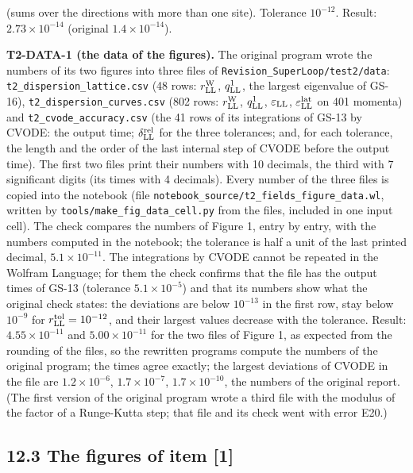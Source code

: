 \documentclass[
  10pt,
]{article}
\begin{document}
(sums over the directions with more than one site). Tolerance
\(10^{-12}\). Result: \(2.73\times10^{-14}\) (original
\(1.4\times10^{-14}\)).

\textbf{T2-DATA-1 (the data of the figures).} The original program wrote
the numbers of its two figures into three files of
\texttt{Revision\_SuperLoop/test2/data}:
\texttt{t2\_dispersion\_lattice.csv} (48 rows: \(r^{\rm W}_{\rm LL}\),
\(q^1_{\rm LL}\), the largest eigenvalue of GS-16),
\texttt{t2\_dispersion\_curves.csv} (802 rows: \(r^{\rm W}_{\rm LL}\),
\(q^1_{\rm LL}\), \(\varepsilon_{\rm LL}\),
\(\varepsilon^{\rm lat}_{\rm LL}\) on 401 momenta) and
\texttt{t2\_cvode\_accuracy.csv} (the 41 rows of its integrations of
GS-13 by CVODE: the output time; \(\delta^{\rm rel}_{\rm LL}\) for the
three tolerances; and, for each tolerance, the length and the order of
the last internal step of CVODE before the output time). The first two
files print their numbers with 10 decimals, the third with 7 significant
digits (its times with 4 decimals). Every number of the three files is
copied into the notebook (file
\texttt{notebook\_source/t2\_fields\_figure\_data.wl}, written by
\texttt{tools/make\_fig\_data\_cell.py} from the files, included in one
input cell). The check compares the numbers of Figure 1, entry by entry,
with the numbers computed in the notebook; the tolerance is half a unit
of the last printed decimal, \(5.1\times10^{-11}\). The integrations by
CVODE cannot be repeated in the Wolfram Language; for them the check
confirms that the file has the output times of GS-13 (tolerance
\(5.1\times10^{-5}\)) and that its numbers show what the original check
states: the deviations are below \(10^{-13}\) in the first row, stay
below \(10^{-9}\) for \(r^{\rm tol}_{\rm LL}=10^{-12}\), and their
largest values decrease with the tolerance. Result:
\(4.55\times10^{-11}\) and \(5.00\times10^{-11}\) for the two files of
Figure 1, as expected from the rounding of the files, so the rewritten
programs compute the numbers of the original program; the times agree
exactly; the largest deviations of CVODE in the file are
\(1.2\times10^{-6}\), \(1.7\times10^{-7}\), \(1.7\times10^{-10}\), the
numbers of the original report. (The first version of the original
program wrote a third file with the modulus of the factor of a
Runge-Kutta step; that file and its check went with error E20.)

\hypertarget{the-figures-of-item-1}{%
\subsection{12.3 The figures of item
{[}1{]}}\label{the-figures-of-item-1}}
\end{document}

